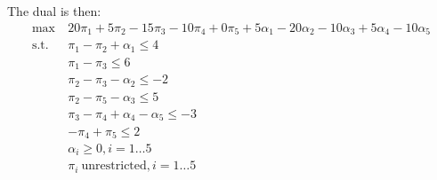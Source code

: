 \documentclass[12pt]{article}
\begin{document}
\begin{enumerate}
  The dual is then:\\
  \begin{equation}
    \begin{split}
      \text{max}\ &20\pi_1+5\pi_2-15\pi_3-10\pi_4+0\pi_5+5\alpha_1-20\alpha_2-10\alpha_3+5\alpha_4-10\alpha_5\\
      \text{s.t.}\ &\pi_1-\pi_2+\alpha_1\leq4\\
      &\pi_1-\pi_3\leq6\\
      &\pi_2-\pi_3-\alpha_2\leq-2\\
      &\pi_2-\pi_5-\alpha_3\leq5\\
      &\pi_3-\pi_4+\alpha_4-\alpha_5\leq-3\\
      &-\pi_4+\pi_5\leq2\\
      &\alpha_i\geq0,i=1\ldots5\\
      &\pi_i\ \text{unrestricted},i=1\ldots5\\
    \end{split}
  \end{equation}


\end{enumerate}
\end{document}
